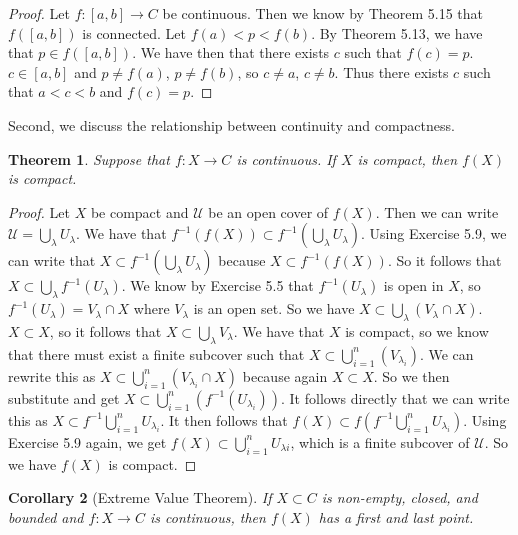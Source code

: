 \documentclass[12pt]{article}
\providecommand{\arr}{\to}
\renewcommand{\_}[1]{\underline{ #1 }}
\newtheorem{theorem}{Theorem}[section]
\newtheorem{corollary}[theorem]{Corollary}
\theoremstyle{definition}
\numberwithin{equation}{subsection}
\begin{document}
\begin{proof}
Let $f : [a,b] \to C$ be continuous. Then we know by Theorem 5.15 that $f([a,b])$ is connected. Let $f(a) < p < f(b)$. By Theorem 5.13, we have that $p \in f([a,b])$. We have then that there exists $c$ such that $f(c) = p$. $c \in [a,b]$ and $p \not = f(a)$, $p \not = f(b)$, so $c \not = a$, $c \not = b$. Thus there exists $c$ such that $a < c < b$ and $f(c) = p$.
\end{proof}

Second, we discuss the relationship between continuity and compactness.
\begin{theorem}  Suppose that $f\colon X\to C$ is continuous.  If $X$ is compact, then $f(X)$ is compact.
\end{theorem}

\begin{proof}
Let $X$ be compact and $\mathcal{U}$ be an open cover of $f(X)$. Then we can write $\mathcal{U} = \bigcup_{\lambda}U_{\lambda}$. We have that $f^{-1}(f(X)) \subset f^{-1}(\bigcup_{\lambda}U_{\lambda})$. Using Exercise 5.9, we can write that $X \subset f^{-1}(\bigcup_{\lambda}U_{\lambda})$ because $X \subset f^{-1}(f(X))$. So it follows that $X \subset \bigcup_{\lambda}f^{-1}(U_{\lambda})$. We know by Exercise 5.5 that $f^{-1}(U_{\lambda})$ is open in $X$, so $f^{-1}(U_{\lambda}) = V_{\lambda} \cap X$ where $V_{\lambda}$ is an open set. So we have $X \subset \bigcup_{\lambda}(V_{\lambda} \cap X)$. $X \subset X$, so it follows that $X \subset \bigcup_{\lambda}V_{\lambda}$. We have that $X$ is compact, so we know that there must exist a finite subcover such that $X \subset \bigcup_{i=1}^{n}(V_{\lambda_{i}})$. We can rewrite this as $X \subset \bigcup_{i=1}^{n}(V_{\lambda_{i}} \cap X)$ because again $X \subset X$. So we then substitute and get $X \subset \bigcup_{i=1}^{n}(f^{-1}(U_{\lambda_{i}}))$. It follows directly that we can write this as $X \subset f^{-1}\bigcup_{i=1}^{n}U_{\lambda_{i}}$. It then follows that $f(X) \subset f(f^{-1}\bigcup_{i=1}^{n}U_{\lambda_{i}})$. Using Exercise 5.9 again, we get $f(X) \subset \bigcup_{i=1}^{n}U_{\lambda{i}}$, which is a finite subcover of $\mathcal{U}$. So we have $f(X)$ is compact.
\end{proof}

\begin{corollary}[Extreme Value Theorem]  If $X \subset C$ is non-empty, closed, and bounded
and $f\colon X \arr C$ is continuous, then 
$f(X)$ has a first and last point.
\end{corollary}
\end{document}
